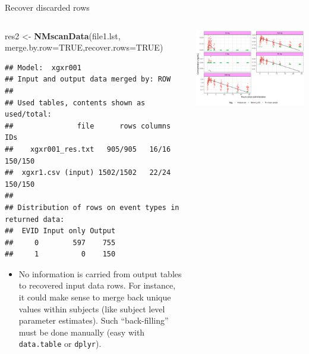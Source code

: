 \documentclass[
  8pt,
  ignorenonframetext,
  aspectratio=169]{beamer}
\newenvironment{Shaded}{\begin{snugshade}}{\end{snugshade}}
\newcommand{\DataTypeTok}[1]{\textcolor[rgb]{0.13,0.29,0.53}{#1}}
\newcommand{\KeywordTok}[1]{\textcolor[rgb]{0.13,0.29,0.53}{\textbf{#1}}}
\newcommand{\NormalTok}[1]{#1}
\newcommand{\OtherTok}[1]{\textcolor[rgb]{0.56,0.35,0.01}{#1}}
\newcommand{\StringTok}[1]{\textcolor[rgb]{0.31,0.60,0.02}{#1}}
\providecommand{\tightlist}{%
  \setlength{\itemsep}{0pt}\setlength{\parskip}{0pt}}
\begin{document}
\begin{frame}[fragile]{Recover discarded rows}
\protect\hypertarget{recover-discarded-rows}{}
\begin{columns}[T]
\begin{column}{0.45\textwidth}
\footnotesize

\begin{Shaded}
\begin{Highlighting}[]
\NormalTok{res2 \textless{}{-}}\StringTok{ }\KeywordTok{NMscanData}\NormalTok{(file1.lst,}
                   \DataTypeTok{merge.by.row=}\OtherTok{TRUE}\NormalTok{,}\DataTypeTok{recover.rows=}\OtherTok{TRUE}\NormalTok{)}
\end{Highlighting}
\end{Shaded}

\begin{verbatim}
## Model:  xgxr001 
## Input and output data merged by: ROW 
## 
## Used tables, contents shown as used/total:
##               file      rows columns     IDs
##    xgxr001_res.txt   905/905   16/16 150/150
##  xgxr1.csv (input) 1502/1502   22/24 150/150
## 
## Distribution of rows on event types in returned data:
##  EVID Input only Output
##     0        597    755
##     1          0    150
\end{verbatim}

\begin{itemize}
\tightlist
\item
  No information is carried from output tables to recovered input data
  rows. For instance, it could make sense to merge back unique values
  within subjects (like subject level parameter estimates). Such
  ``back-filling'' must be done manually (easy with \texttt{data.table}
  or \texttt{dplyr}).
\end{itemize}
\end{column}

\begin{column}{0.55\textwidth}
\begin{center}\includegraphics[width=1.05\linewidth]{plots/unnamed-chunk-29-1} \end{center}
\end{column}
\end{columns}
\end{frame}
\end{document}
